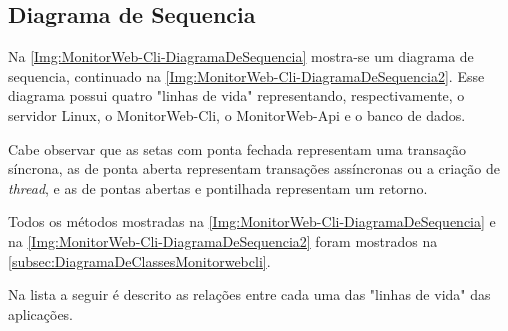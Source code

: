 \subsection{Diagrama de Sequencia}\label{subsec:executandoMonitorWeb-clie}

Na \autoref{Img:MonitorWeb-Cli-DiagramaDeSequencia} mostra-se um diagrama de sequencia, continuado na  \autoref{Img:MonitorWeb-Cli-DiagramaDeSequencia2}. Esse diagrama possui quatro "linhas de vida"  representando, respectivamente, o servidor Linux, o MonitorWeb-Cli, o MonitorWeb-Api e o banco de dados.

Cabe observar que as setas com ponta fechada representam uma transação síncrona, as de ponta aberta representam transações assíncronas ou a criação de \textit{thread}, e as de pontas abertas e pontilhada representam um retorno.

Todos os métodos mostradas na \autoref{Img:MonitorWeb-Cli-DiagramaDeSequencia} e na \autoref{Img:MonitorWeb-Cli-DiagramaDeSequencia2} foram mostrados na \autoref{subsec:DiagramaDeClassesMonitorwebcli}. 

Na lista a seguir é descrito as relações entre cada uma das "linhas de vida" das aplicações.

